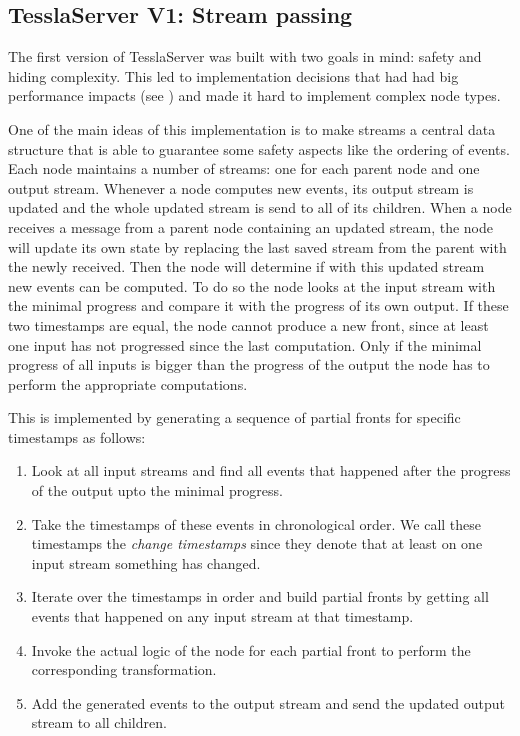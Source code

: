 \subsection{TesslaServer V1: Stream passing}
\label{sec:implementation:tesslaserver:v1}

The first version of TesslaServer was built with two goals in mind: safety and hiding complexity.
This led to implementation decisions that had had big performance impacts (see ) and made it hard to implement complex node types.

One of the main ideas of this implementation is to make streams a central data structure that is able to guarantee some safety aspects like the ordering of events.
Each node maintains a number of streams: one for each parent node and one output stream.
Whenever a node computes new events, its output stream is updated and the whole updated stream is send to all of its children.
When a node receives a message from a parent node containing an updated stream, the node will update its own state by replacing the last saved stream from the parent with the newly received.
Then the node will determine if with this updated stream new events can be computed.
To do so the node looks at the input stream with the minimal progress and compare it with the progress of its own output.
If these two timestamps are equal, the node cannot produce a new front, since at least one input has not progressed since the last computation.
Only if the minimal progress of all inputs is bigger than the progress of the output the node has to perform the appropriate computations.

This is implemented by generating a sequence of partial fronts for specific timestamps as follows:

\begin{enumerate}
  \item Look at all input streams and find all events that happened after the progress of the output upto the minimal progress.
  \item Take the timestamps of these events in chronological order. We call these timestamps the \emph{change timestamps} since they denote that at least on one input stream something has changed.
  \item Iterate over the timestamps in order and build partial fronts by getting all events that happened on any input stream at that timestamp.
  \item\label{sec:implementation:tesslaserver:v1:item_logic_call} Invoke the actual logic of the node for each partial front to perform the corresponding transformation.
  \item Add the generated events to the output stream and send the updated output stream to all children.
\end{enumerate}

